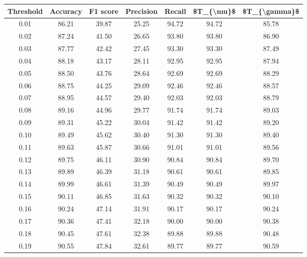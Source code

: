 \begin{tabular}{|c|c|c|c|c|c|c|}
\hline
 Threshold &  Accuracy &  F1 score &  Precision &  Recall &  \$T\_\{\textbackslash mu\}\$ &  \$T\_\{\textbackslash gamma\}\$ \\
\hline
      0.01 &     86.21 &     39.87 &      25.25 &   94.72 &      94.72 &         85.78 \\
      0.02 &     87.24 &     41.50 &      26.65 &   93.80 &      93.80 &         86.90 \\
      0.03 &     87.77 &     42.42 &      27.45 &   93.30 &      93.30 &         87.49 \\
      0.04 &     88.18 &     43.17 &      28.11 &   92.95 &      92.95 &         87.94 \\
      0.05 &     88.50 &     43.76 &      28.64 &   92.69 &      92.69 &         88.29 \\
      0.06 &     88.75 &     44.25 &      29.09 &   92.46 &      92.46 &         88.57 \\
      0.07 &     88.95 &     44.57 &      29.40 &   92.03 &      92.03 &         88.79 \\
      0.08 &     89.16 &     44.96 &      29.77 &   91.74 &      91.74 &         89.03 \\
      0.09 &     89.31 &     45.22 &      30.04 &   91.42 &      91.42 &         89.20 \\
      0.10 &     89.49 &     45.62 &      30.40 &   91.30 &      91.30 &         89.40 \\
      0.11 &     89.63 &     45.87 &      30.66 &   91.01 &      91.01 &         89.56 \\
      0.12 &     89.75 &     46.11 &      30.90 &   90.84 &      90.84 &         89.70 \\
      0.13 &     89.89 &     46.39 &      31.18 &   90.61 &      90.61 &         89.85 \\
      0.14 &     89.99 &     46.61 &      31.39 &   90.49 &      90.49 &         89.97 \\
      0.15 &     90.11 &     46.85 &      31.63 &   90.32 &      90.32 &         90.10 \\
      0.16 &     90.24 &     47.14 &      31.91 &   90.17 &      90.17 &         90.24 \\
      0.17 &     90.36 &     47.41 &      32.18 &   90.00 &      90.00 &         90.38 \\
      0.18 &     90.45 &     47.61 &      32.38 &   89.88 &      89.88 &         90.48 \\
      0.19 &     90.55 &     47.84 &      32.61 &   89.77 &      89.77 &         90.59 \\

\end{tabular}
